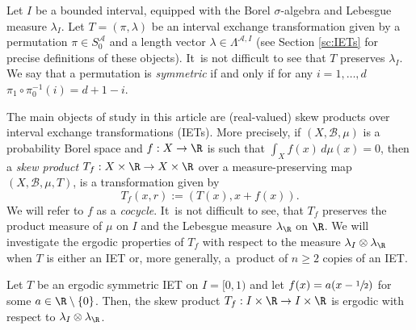 Let $I$ be a bounded interval, equipped with the Borel $\sigma$-algebra and Lebesgue measure $\lambda_{I}$. Let $T=(\pi,\lambda)$ be an interval exchange transformation given by a permutation $\pi\in S_0^\mathcal A$ and a length vector $\lambda\in\Lambda^{\mathcal A,I}$
{(see Section \ref{sc:IETs} for precise definitions of these objects)}. It~is not difficult to see that $T$ preserves $\lambda_{I}$. We say that a permutation is \emph{symmetric} if and only if for any $i = 1, \dots, d$ $\pi_1\circ\pi_0^{-1}(i)=d+1-i$.

The main objects of study in this article are (real-valued) skew products over interval exchange transformations (IETs). More precisely, if $(X,\mathcal B,\mu)$ is a probability Borel space and $f:X\to \R$ is such that $\int_X f(x)\,d\mu(x)=0$, then a \emph{skew product} $T_f:X\times \R\to X\times \R$ over a measure-preserving map $(X,\mathcal B,\mu,T)$, is a transformation given by
\[
T_f(x,r):=(T(x),x+f(x)).
\]
We will refer to $f$ as a \emph{cocycle}. It~is not difficult to see, that $T_f$ preserves the product measure of $\mu$ on $I$ and the Lebesgue measure $\lambda_{\R}$ on $\R$. We will investigate the ergodic properties of $T_f$ with respect to the measure $\lambda_I\otimes\lambda_{\R}$ when $T$ is either an IET or, more generally, a~product of $n \ge 2$ copies of an IET.

\begin{theorem}\label{thm: ergo}
Let $T$ be an ergodic symmetric IET on $I = [0, 1)$ and let $f(x)=a(x-\sfrac{1}{2})$ for some $a\in\R\setminus\{0\}$. Then, the skew product $T_f:I\times\R\to I\times \R$ is ergodic with respect to $\lambda_I\otimes\lambda_{\R}$.
\end{theorem}
